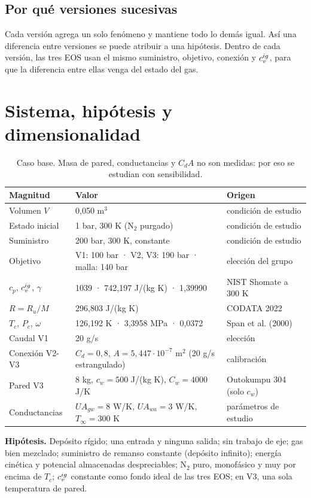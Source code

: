 \documentclass[11pt]{article}
\begin{document}
\subsection{Por qué versiones sucesivas}
Cada versión agrega un solo fenómeno y mantiene todo lo demás igual. Así una diferencia entre versiones
se puede atribuir a una hipótesis. Dentro de cada versión, las tres EOS usan el mismo suministro, objetivo,
conexión y $c_v^{ig}$, para que la diferencia entre ellas venga del estado del gas.

\section{Sistema, hipótesis y dimensionalidad}
\begin{table}[h]\centering\small
\begin{tabular}{lll}\toprule
Magnitud & Valor & Origen\\\midrule
Volumen $V$ & 0,050 m$^3$ & condición de estudio\\
Estado inicial & 1 bar, 300 K (N$_2$ purgado) & condición de estudio\\
Suministro & 200 bar, 300 K, constante & condición de estudio\\
Objetivo & V1: 100 bar · V2, V3: 190 bar · malla: 140 bar & elección del grupo\\
$c_p$, $c_v^{ig}$, $\gamma$ & 1039 · 742,197 J/(kg K) · 1,39990 & NIST Shomate a 300 K\\
$R=R_u/M$ & 296,803 J/(kg K) & CODATA 2022\\
$T_c$, $P_c$, $\omega$ & 126,192 K · 3,3958 MPa · 0,0372 & Span et al. (2000)\\
Caudal V1 & 20 g/s & elección\\
Conexión V2-V3 & $C_d=0{,}8$, $A=5{,}447\cdot10^{-7}$ m$^2$ (20 g/s estrangulado) & calibración\\
Pared V3 & 8 kg, $c_w=500$ J/(kg K), $C_w=4000$ J/K & Outokumpu 304 (solo $c_w$)\\
Conductancias & $UA_{gw}=8$ W/K, $UA_{wa}=3$ W/K, $T_\infty=300$ K & parámetros de estudio\\\bottomrule
\end{tabular}
\caption{Caso base. Masa de pared, conductancias y $C_dA$ no son medidas: por eso se estudian con sensibilidad.}
\end{table}

\textbf{Hipótesis.} Depósito rígido; una entrada y ninguna salida; sin trabajo de eje; gas bien mezclado;
suministro de remanso constante (depósito infinito); energía cinética y potencial almacenadas despreciables;
N$_2$ puro, monofásico y muy por encima de $T_c$; $c_v^{ig}$ constante como fondo ideal de las tres EOS;
en V3, una sola temperatura de pared.
\end{document}

